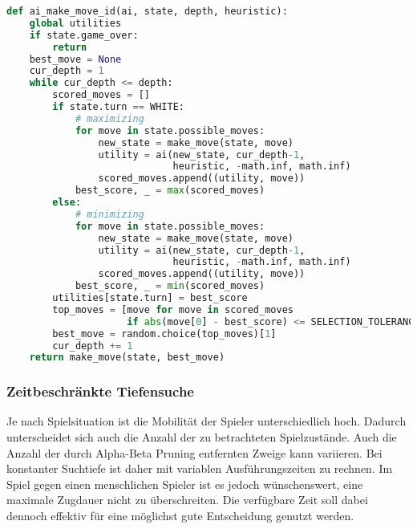 \begin{lstlisting}[language=Python]
def ai_make_move_id(ai, state, depth, heuristic):
    global utilities
    if state.game_over:
        return
    best_move = None
    cur_depth = 1
    while cur_depth <= depth:
        scored_moves = []
        if state.turn == WHITE:
            # maximizing
            for move in state.possible_moves:
                new_state = make_move(state, move)
                utility = ai(new_state, cur_depth-1,
                             heuristic, -math.inf, math.inf)
                scored_moves.append((utility, move))
            best_score, _ = max(scored_moves)
        else:
            # minimizing
            for move in state.possible_moves:
                new_state = make_move(state, move)
                utility = ai(new_state, cur_depth-1,
                             heuristic, -math.inf, math.inf)
                scored_moves.append((utility, move))
            best_score, _ = min(scored_moves)
        utilities[state.turn] = best_score
        top_moves = [move for move in scored_moves
                     if abs(move[0] - best_score) <= SELECTION_TOLERANCE]
        best_move = random.choice(top_moves)[1]
        cur_depth += 1
    return make_move(state, best_move)
\end{lstlisting}

\hypertarget{zeitbeschruxe4nkte-tiefensuche}{%
\subsubsection{Zeitbeschränkte
Tiefensuche}\label{zeitbeschruxe4nkte-tiefensuche}}

Je nach Spielsituation ist die Mobilität der Spieler unterschiedlich
hoch. Dadurch unterscheidet sich auch die Anzahl der zu betrachteten
Spielzustände. Auch die Anzahl der durch Alpha-Beta Pruning entfernten
Zweige kann variieren. Bei konstanter Suchtiefe ist daher mit variablen
Ausführungszeiten zu rechnen. Im Spiel gegen einen menschlichen Spieler
ist es jedoch wünschenswert, eine maximale Zugdauer nicht zu
überschreiten. Die verfügbare Zeit soll dabei dennoch effektiv für eine
möglichst gute Entscheidung genutzt werden.

